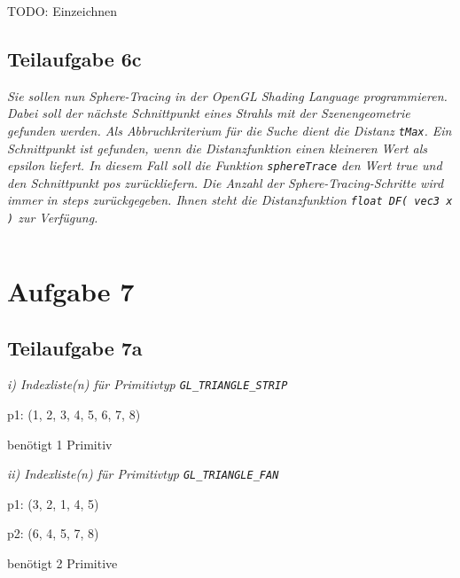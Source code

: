 \documentclass[a4paper]{scrartcl}
\begin{document}
TODO: Einzeichnen

\clearpage
\subsection*{Teilaufgabe 6c}
\textit{Sie sollen nun Sphere-Tracing in der OpenGL Shading Language
programmieren. Dabei soll der nächste Schnittpunkt eines Strahls mit der
Szenengeometrie gefunden werden. Als Abbruchkriterium für die Suche dient die
Distanz \texttt{tMax}. Ein Schnittpunkt ist gefunden, wenn die Distanzfunktion
einen kleineren Wert als epsilon liefert. In diesem Fall soll die Funktion
\texttt{sphereTrace} den Wert true und den Schnittpunkt pos zurückliefern. Die
Anzahl der Sphere-Tracing-Schritte wird immer in steps zurückgegeben. Ihnen
steht die Distanzfunktion \texttt{float DF( vec3 x )} zur Verfügung.}

\inputminted[linenos, numbersep=5pt, tabsize=4, frame=lines, label=spheretracing.frag]{glsl}{spheretracing.frag}

\clearpage
\section*{Aufgabe 7}
\subsection*{Teilaufgabe 7a}
\textit{i) Indexliste(n) für Primitivtyp \texttt{GL\_TRIANGLE\_STRIP}}

p1: (1, 2, 3, 4, 5, 6, 7, 8)

benötigt 1 Primitiv


\textit{ii) Indexliste(n) für Primitivtyp \texttt{GL\_TRIANGLE\_FAN}}

p1: (3, 2, 1, 4, 5)

p2: (6, 4, 5, 7, 8)

benötigt 2 Primitive
\end{document}
